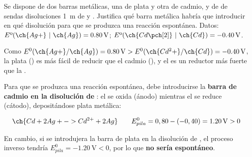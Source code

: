\begin{exerciseEVAU}
    Se dispone de dos barras metálicas, una de plata y otra de cadmio, y de  de sendas disoluciones \SI{1}{\m}  de  y . Justifica qué barra metálica habría que introducir en qué disolución para que se produzca una reacción espontánea. Datos: \( E\text{º}(\ch{Ag+}\ | \ \ch{Ag}) = \SI{+0.80}{\volt} \); \( E\text{º}(\ch{Cd\pch[2]}\ | \ \ch{Cd}) = \SI{-0.40}{\volt} \).

    \begin{solu}


        Como \(E^0(\ch{Ag+}/\ch{Ag}) = \SI{0.80}{\volt} > E^0(\ch{Cd^2+}/\ch{Cd}) = \SI{-0.40}{\volt}\), la plata () es más fácil de reducir que el cadmio (), y el  es un reductor más fuerte que la .

        Para que se produzca una reacción espontánea, debe introducirse la \textbf{barra de cadmio en la disolución de }: el  se oxida (ánodo) mientras el  se reduce (cátodo), depositándose plata metálica:

        \begin{equation*}
            \ch{Cd + 2 Ag+ -> Cd^{2+} + 2 Ag} \qquad E^0_{pila} = 0,80-(-0,40) = \SI{1.20}{\volt} > 0
        \end{equation*}

        En cambio, si se introdujera la barra de plata en la disolución de , el proceso inverso tendría \(E^0_{pila} = \SI{-1.20}{\volt} < 0\), por lo que \textbf{no sería espontáneo}.

    \end{solu}
\end{exerciseEVAU}

